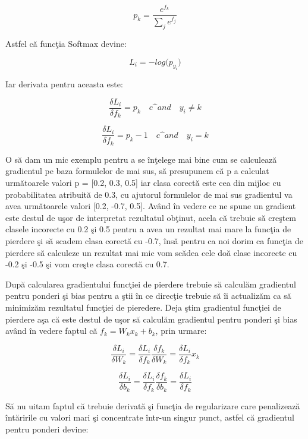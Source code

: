 $$p_k = \frac{e^{f_k}}{\sum_j e^{f_j}}$$

Astfel c\u{a} func\c{t}ia Softmax devine:

$$L_i = - log \big( p_{y_i} \big)$$

Iar derivata pentru aceasta este:

$$\frac{\delta L_i}{\delta f_k } = p_k \quad c\^{a}nd \quad y_i \neq k$$

$$\frac{\delta L_i}{\delta f_k } = p_k - 1 \quad c\^{a}nd \quad y_i = k$$

O s\u{a} dam un mic exemplu pentru a se \^{i}n\c{t}elege mai bine cum se calculeaz\u{a} gradientul pe baza formulelor de mai sus, s\u{a} presupunem c\u{a} p a calculat urm\u{a}toarele valori p = [0.2, 0.3, 0.5] iar clasa corect\u{a} este cea din mijloc cu probabilitatea atribuit\u{a} de 0.3, cu ajutorul formulelor de mai sus gradientul va avea urm\u{a}toarele valori [0.2, -0.7, 0.5]. Av\^{a}nd \^{i}n vedere ce ne spune un gradient este destul de u\c{s}or de interpretat rezultatul ob\c{t}inut, acela c\u{a} trebuie s\u{a} cre\c{s}tem clasele incorecte cu 0.2 \c{s}i 0.5 pentru a avea un rezultat mai mare la func\c{t}ia de pierdere \c{s}i s\u{a} scadem clasa corect\u{a} cu -0.7, \^{i}ns\u{a} pentru ca noi dorim ca func\c{t}ia de pierdere s\u{a} calculeze un rezultat mai mic vom sc\u{a}dea cele do\u{a} clase incorecte cu -0.2 \c{s}i -0.5 \c{s}i vom cre\c{s}te clasa corect\u{a} cu 0.7.

\par

Dup\u{a} calcularea gradientului func\c{t}iei de pierdere trebuie s\u{a} calcul\u{a}m gradientul pentru ponderi \c{s}i bias pentru a \c{s}tii \^{i}n ce direc\c{t}ie trebuie s\u{a} \^{i}i actualiz\u{a}m ca s\u{a} minimiz\u{a}m rezultatul func\c{t}iei de pieredere. Deja \c{s}tim gradientul func\c{t}iei de pierdere a\c{s}a c\u{a} este destul de u\c{s}or s\u{a} calcul\u{a}m gradientul pentru ponderi \c{s}i bias av\^{a}nd \^{i}n vedere faptul c\u{a} $f_k = W_k x_k + b_k$, prin urmare:

$$\frac{\delta L_i}{\delta W_k} = \frac{\delta L_i}{\delta f_k} \frac{\delta f_k}{\delta W_k} = \frac{\delta L_i}{\delta f_k} x_k$$

$$\frac{\delta L_i}{\delta b_k} = \frac{\delta L_i}{\delta f_k} \frac{\delta f_k}{\delta b_k} = \frac{\delta L_i}{\delta f_k}$$

S\u{a} nu uitam faptul c\u{a} trebuie derivat\u{a} \c{s}i func\c{t}ia de regularizare care penalizeaz\u{a} \^{i}nt\u{a}ririle cu valori mari \c{s}i concentrate \^{i}ntr-un singur punct, astfel c\u{a} gradientul pentru ponderi devine: 

